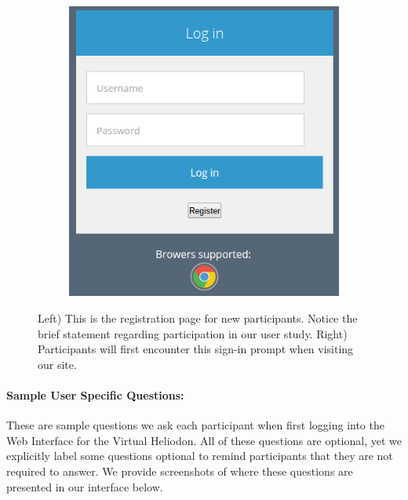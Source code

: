 \documentclass[12pt]{article}
\begin{document}
\begin{figure}[h]
  \begin{subfigure}{.5\textwidth}
    \centering
    \includegraphics[scale=0.4]{ss_sign}
  \end{subfigure}
\caption{Left) This is the registration page for new participants. Notice the brief statement regarding participation in our user study. Right) Participants will first encounter this sign-in prompt when visiting our site.}  

\label{fig:registration}
\end{figure}

\newpage
\paragraph{Sample User Specific Questions:}
These are sample questions we ask each participant when first logging into the Web Interface for the Virtual Heliodon.
All of these questions are optional, yet we explicitly label some questions optional to remind participants that they are not required to answer. 
We provide screenshots of where these questions are presented in our interface below.
\end{document}
